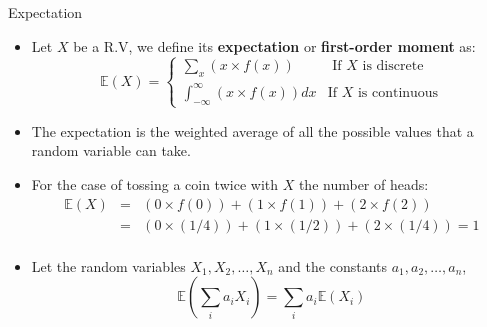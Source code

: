 \documentclass[handout]{beamer}
\begin{document}
\begin{frame}{Expectation}
\scriptsize{
\begin{itemize}
 \item Let $X$ be a R.V, we define its \textbf{expectation} or \textbf{first-order moment} as:
  \begin{displaymath}
  \mathbb{E}(X) = \left\{ \begin{array}{rl}
  \sum_{x}(x\times f(x)) &\mbox{ If $X$ is discrete} \\
   \int_{-\infty}^{\infty}(x\times f(x))dx &\mbox{If $X$ is continuous}
       \end{array} \right.
  \end{displaymath}
\item The expectation is the weighted average of all the possible values that a random variable can take.

\item For the case of tossing a coin twice with $X$ the number of heads:
 \begin{eqnarray*}
  \mathbb{E}(X) & = & (0 \times f(0)) + (1 \times f(1)) + (2 \times f(2)) \nonumber \\
       & = & (0 \times (1/4)) + (1 \times (1/2)) + (2 \times (1/4)) =1  \nonumber \\
 \end{eqnarray*}


\item Let the random variables $X_1, X_2, \dots , X_n$ and the constants $a_1, a_2, \dots, a_n$,
\begin{displaymath}
 \mathbb{E}\left(\sum_{i}a_i X_i \right) = \sum_{i} a_{i} \mathbb{E}(X_i)
\end{displaymath}
 


\end{itemize}
}

\end{frame}
\end{document}
